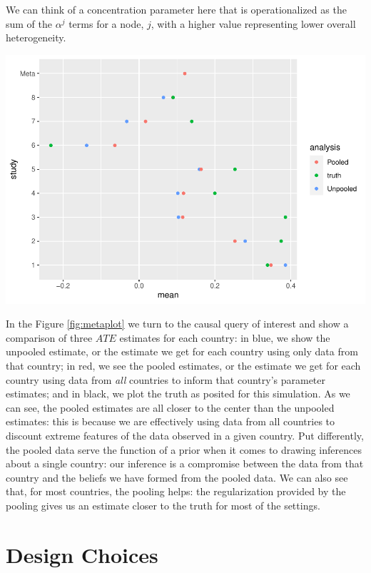 \documentclass[
  12pt,
]{book}
\begin{document}
We can think of a concentration parameter here that is operationalized as the sum of the \(\alpha^j\) terms for a node, \(j\), with a higher value representing lower overall heterogeneity.

\includegraphics{ii_files/figure-latex/metaplot-1.pdf}

In the Figure \ref{fig:metaplot} we turn to the causal query of interest and show a comparison of three \(ATE\) estimates for each country: in blue, we show the unpooled estimate, or the estimate we get for each country using only data from that country; in red, we see the pooled estimates, or the estimate we get for each country using data from \emph{all} countries to inform that country's parameter estimates; and in black, we plot the truth as posited for this simulation. As we can see, the pooled estimates are all closer to the center than the unpooled estimates: this is because we are effectively using data from all countries to discount extreme features of the data observed in a given country. Put differently, the pooled data serve the function of a prior when it comes to drawing inferences about a single country: our inference is a compromise between the data from that country and the beliefs we have formed from the pooled data. We can also see that, for most countries, the pooling helps: the regularization provided by the pooling gives us an estimate closer to the truth for most of the settings.

\hypertarget{part-design-choices}{%
\part{Design Choices}\label{part-design-choices}}
\end{document}
